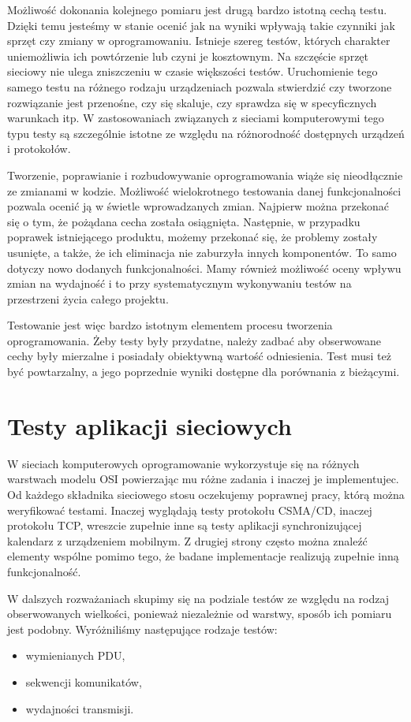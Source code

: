 \documentclass[00-praca-magisterska.tex]{subfiles}
\begin{document}
Możliwość dokonania kolejnego pomiaru jest drugą bardzo istotną cechą testu.
Dzięki temu jesteśmy w stanie ocenić jak na wyniki wpływają takie czynniki jak
sprzęt czy zmiany w oprogramowaniu. Istnieje szereg testów, których charakter
uniemożliwia ich powtórzenie lub czyni je kosztownym. Na szczęście sprzęt
sieciowy nie ulega zniszczeniu w czasie większości testów. Uruchomienie tego
samego testu na różnego rodzaju urządzeniach pozwala stwierdzić czy tworzone
rozwiązanie jest przenośne, czy się skaluje, czy sprawdza się w specyficznych
warunkach itp. W zastosowaniach związanych z sieciami komputerowymi tego typu
testy są szczególnie istotne ze względu na różnorodność dostępnych urządzeń i
protokołów.

Tworzenie, poprawianie i rozbudowywanie oprogramowania wiąże się nieodłącznie
ze zmianami w kodzie. Możliwość wielokrotnego testowania danej funkcjonalności
pozwala ocenić ją w świetle wprowadzanych zmian. Najpierw można przekonać się o
tym, że pożądana cecha została osiągnięta. Następnie, w przypadku poprawek
istniejącego produktu, możemy przekonać się, że problemy zostały usunięte, a
także, że ich eliminacja nie zaburzyła innych komponentów. To samo dotyczy nowo
dodanych funkcjonalności. Mamy również możliwość oceny wpływu zmian na
wydajność i to przy systematycznym wykonywaniu testów na przestrzeni życia
całego projektu.

Testowanie jest więc bardzo istotnym elementem procesu tworzenia
oprogramowania. Żeby testy były przydatne, należy zadbać aby obserwowane cechy
były mierzalne i posiadały obiektywną wartość odniesienia. Test musi też być
powtarzalny, a jego poprzednie wyniki dostępne dla porównania z bieżącymi.

\section{Testy aplikacji sieciowych}

W sieciach komputerowych oprogramowanie wykorzystuje się na różnych warstwach
modelu OSI powierzając mu różne zadania i inaczej je implementujec. Od każdego
składnika sieciowego stosu oczekujemy poprawnej pracy, którą można weryfikować
testami. Inaczej wyglądają testy protokołu CSMA/CD, inaczej protokołu TCP,
wreszcie zupełnie inne są testy aplikacji synchronizującej kalendarz z
urządzeniem mobilnym. Z drugiej strony często można znaleźć elementy wspólne
pomimo tego, że badane implementacje realizują zupełnie inną funkcjonalność.

W dalszych rozważaniach skupimy się na podziale testów ze względu na rodzaj
obserwowanych wielkości, ponieważ niezależnie od warstwy, sposób ich pomiaru
jest podobny. Wyróżniliśmy następujące rodzaje testów:
\begin{itemize}
  \item wymienianych PDU,
  \item sekwencji komunikatów,
  \item wydajności transmisji.
\end{itemize}
\end{document}
